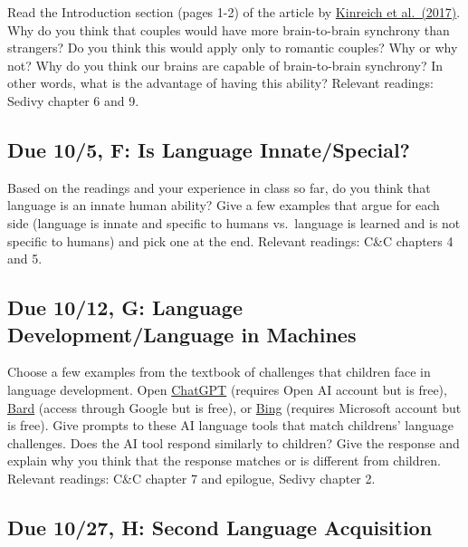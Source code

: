 \documentclass[
  letterpaper,
  DIV=11,
  numbers=noendperiod]{scrreprt}
\begin{document}
Read the Introduction section (pages 1-2) of the article by
\href{papers/Kinreichetal2017.pdf}{Kinreich et al.~(2017)}. Why do you
think that couples would have more brain-to-brain synchrony than
strangers? Do you think this would apply only to romantic couples? Why
or why not? Why do you think our brains are capable of brain-to-brain
synchrony? In other words, what is the advantage of having this ability?
Relevant readings: Sedivy chapter 6 and 9.

\hypertarget{due-105-f-is-language-innatespecial}{%
\subsection*{Due 10/5, F: Is Language
Innate/Special?}\label{due-105-f-is-language-innatespecial}}

Based on the readings and your experience in class so far, do you think
that language is an innate human ability? Give a few examples that argue
for each side (language is innate and specific to humans vs.~language is
learned and is not specific to humans) and pick one at the end. Relevant
readings: C\&C chapters 4 and 5.

\hypertarget{due-1012-g-language-developmentlanguage-in-machines}{%
\subsection*{Due 10/12, G: Language Development/Language in
Machines}\label{due-1012-g-language-developmentlanguage-in-machines}}

Choose a few examples from the textbook of challenges that children face
in language development. Open \href{https://chat.openai.com/}{ChatGPT}
(requires Open AI account but is free),
\href{https://bard.google.com/}{Bard} (access through Google but is
free), or \href{https://www.bing.com/?scope=web\&FORM=HDRSC2}{Bing}
(requires Microsoft account but is free). Give prompts to these AI
language tools that match childrens' language challenges. Does the AI
tool respond similarly to children? Give the response and explain why
you think that the response matches or is different from children.
Relevant readings: C\&C chapter 7 and epilogue, Sedivy chapter 2.

\hypertarget{due-1027-h-second-language-acquisition}{%
\subsection*{Due 10/27, H: Second Language
Acquisition}\label{due-1027-h-second-language-acquisition}}
\end{document}
